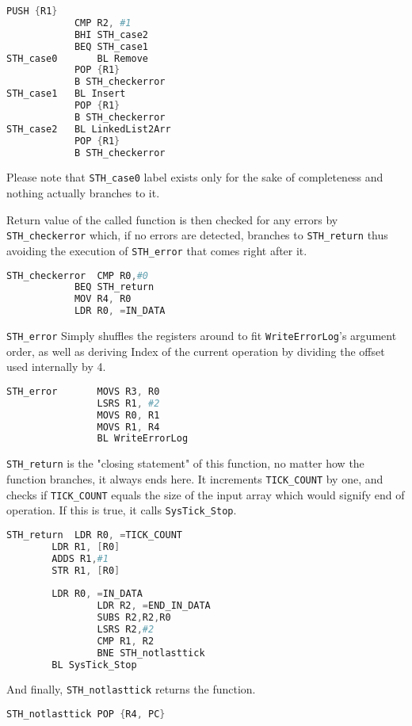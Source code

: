 \documentclass[pdftex,12pt,a4paper]{article}
\begin{document}
\begin{lstlisting}[language=Assembler]
                PUSH {R1}
        	CMP R2, #1
        	BHI STH_case2
        	BEQ STH_case1
STH_case0       BL Remove
        	POP {R1}
        	B STH_checkerror
STH_case1	BL Insert
        	POP {R1}
        	B STH_checkerror
STH_case2	BL LinkedList2Arr
        	POP {R1}
        	B STH_checkerror
\end{lstlisting}
Please note that \verb|STH_case0| label exists only for the sake of completeness and nothing actually branches to it.

Return value of the called function is then checked for any errors by \verb|STH_checkerror| which, if no errors are detected, branches to \verb|STH_return| thus avoiding the execution of \verb|STH_error| that comes right after it.

\begin{lstlisting}[language=Assembler]
STH_checkerror  CMP R0,#0
	        BEQ STH_return
	        MOV R4, R0
	        LDR R0, =IN_DATA
\end{lstlisting}

\verb|STH_error| Simply shuffles the registers around to fit \verb|WriteErrorLog|'s argument order, as well as deriving Index of the current operation by dividing the offset used internally by 4.

\begin{lstlisting}[language=Assembler]
STH_error       MOVS R3, R0
                LSRS R1, #2
                MOVS R0, R1
                MOVS R1, R4
                BL WriteErrorLog
\end{lstlisting}

\verb|STH_return| is the "closing statement" of this function, no matter how the function branches, it always ends here. It increments \verb|TICK_COUNT| by one, and checks if \verb|TICK_COUNT| equals the size of the input array which would signify end of operation. If this is true, it calls \verb|SysTick_Stop|.

\begin{lstlisting}[language=Assembler]
STH_return	LDR R0, =TICK_COUNT
		LDR R1, [R0]
		ADDS R1,#1
		STR R1, [R0]
				
		LDR R0, =IN_DATA
                LDR R2, =END_IN_DATA
                SUBS R2,R2,R0
                LSRS R2,#2
                CMP R1, R2
                BNE STH_notlasttick
		BL SysTick_Stop
\end{lstlisting}

And finally, \verb|STH_notlasttick| returns the function.
\begin{lstlisting}[language=Assembler]
    STH_notlasttick POP {R4, PC}
\end{lstlisting}
\end{document}
